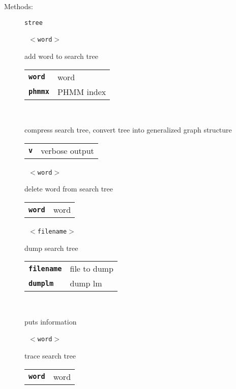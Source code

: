 \begin{description}
\vspace{3mm} \item[Methods:] \texttt{stree}

    \begin{description}
       \texttt{ $<$word$>$ } \

        add word to search tree

      \begin{tabular}{ll}
 \texttt{\textbf{word}} &  word \\
 \texttt{\textbf{phmmx}} &  PHMM index  \\
      \end{tabular}
       \texttt{ } \

        compress search tree, convert tree into generalized graph structure

      \begin{tabular}{ll}
 \texttt{\textbf{v}} &    verbose output  \\
      \end{tabular}
       \texttt{ $<$word$>$} \

        delete word from search tree

      \begin{tabular}{ll}
 \texttt{\textbf{word}} &  word \\
      \end{tabular}
       \texttt{ $<$filename$>$ } \

        dump search tree

      \begin{tabular}{ll}
 \texttt{\textbf{filename}} &  file to dump  \\
 \texttt{\textbf{dumplm}} &     dump lm  \\
      \end{tabular}
       \texttt{} \

        puts information

       \texttt{ $<$word$>$} \

        trace search tree

      \begin{tabular}{ll}
 \texttt{\textbf{word}} &  word \\
      \end{tabular}
    \end{description}


\end{description}

